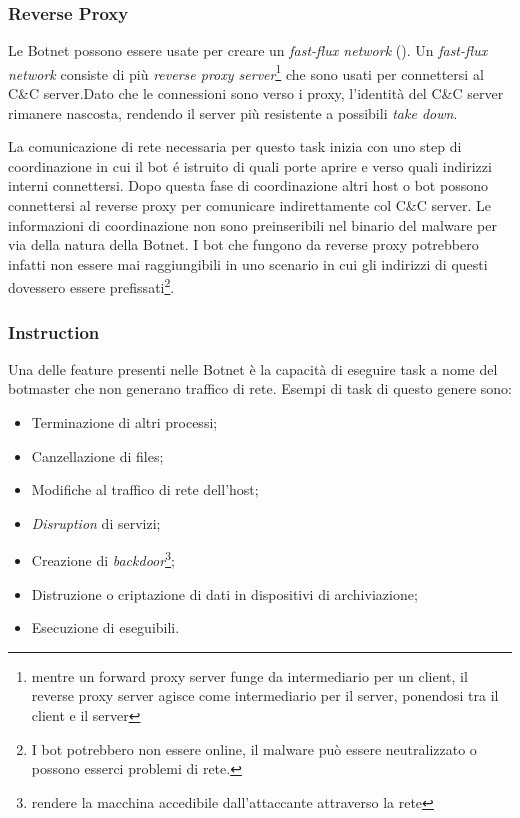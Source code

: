 \subsubsection{Reverse Proxy}
Le Botnet possono essere usate per creare un \emph{fast-flux network} (). Un \emph{fast-flux network} consiste di più \emph{reverse proxy server}\footnote{mentre un forward proxy server funge da intermediario per un client, il reverse proxy server agisce come intermediario per il server, ponendosi tra il client e il server} che sono usati per connettersi al C\&C server.Dato che le connessioni sono verso i proxy, l'identità del C\&C server rimanere nascosta, rendendo il server più resistente a possibili \textit{take down}.

La comunicazione di rete necessaria per questo task inizia con uno step di coordinazione in cui il bot é istruito di quali porte aprire e verso quali indirizzi interni connettersi. Dopo questa fase di coordinazione altri host o bot possono connettersi al reverse proxy per comunicare indirettamente col C\&C server. Le informazioni di coordinazione non sono preinseribili nel binario del malware per via della natura della Botnet. I bot che fungono da reverse proxy potrebbero infatti  non essere mai raggiungibili  in uno scenario in cui gli indirizzi di questi dovessero essere prefissati\footnote{I bot potrebbero non essere online, il malware può essere neutralizzato o possono esserci problemi di rete.}.

\subsubsection{Instruction}
Una delle feature presenti nelle Botnet è la capacità di eseguire task a nome del botmaster che non generano traffico di rete. Esempi di task di questo genere sono: 
\begin{itemize}
    \item Terminazione di  altri processi;
    \item Canzellazione di  files;
    \item Modifiche al  traffico di rete dell'host;
    \item \textit{Disruption} di  servizi;
    \item Creazione di  \textit{backdoor}\footnote{rendere la macchina accedibile dall'attaccante attraverso la  rete };
    \item Distruzione o criptazione di dati in dispositivi di archiviazione;
    \item Esecuzione di eseguibili.
\end{itemize}

